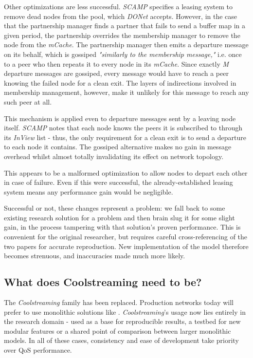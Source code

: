 \documentclass[12pt,a4paper]{article}
\begin{document}
Other optimizations are less successful. \textit{SCAMP} specifies a leasing system to remove dead nodes from the pool, which \textit{DONet} accepts. However, in the case that the partnership manager finds a partner that fails to send a buffer map in a given period, the partnership overrides the membership manager to remove the node from the \textit{mCache}. The partnership manager then emits a departure message on its behalf, which is gossiped \textit{"similarly to the membership message,"} i.e. once to a peer who then repeats it to every node in its \textit{mCache}. Since exactly \textit{M} departure messages are gossiped, every message would have to reach a peer knowing the failed node for a clean exit. The layers of indirections involved in membership management, however, make it unlikely for this message to reach any such peer at all.

This mechanism is applied even to departure messages sent by a leaving node itself. \textit{SCAMP} notes that each node knows the peers it is subscribed to through its \textit{InView} list - thus, the only requirement for a clean exit is to send a departure to each node it contains. The gossiped alternative makes no gain in message overhead whilst almost totally invalidating its effect on network topology.

This appears to be a malformed optimization to allow nodes to depart each other in case of failure. Even if this were successful, the already-established leasing system means any performance gain would be negligible.

Successful or not, these changes represent a problem: we fall back to some existing research solution for a problem and then brain slug  it for some slight gain, in the process tampering with that solution's proven performance. This is convenient for the original researcher, but requires careful cross-referencing of the two papers for accurate reproduction. New implementation of the model therefore becomes strenuous, and inaccuracies made much more likely.

\subsection{What does Coolstreaming need to be?}
The \textit{Coolstreaming} family has been replaced. Production networks today will prefer to use monolithic solutions like . \textit{Coolstreaming}'s usage now lies entirely in the research domain - used as a base for reproducible results, a testbed for new modular features or a shared point of comparison between larger monolithic models. In all of these cases, consistency and ease of development take priority over QoS performance.
\end{document}
